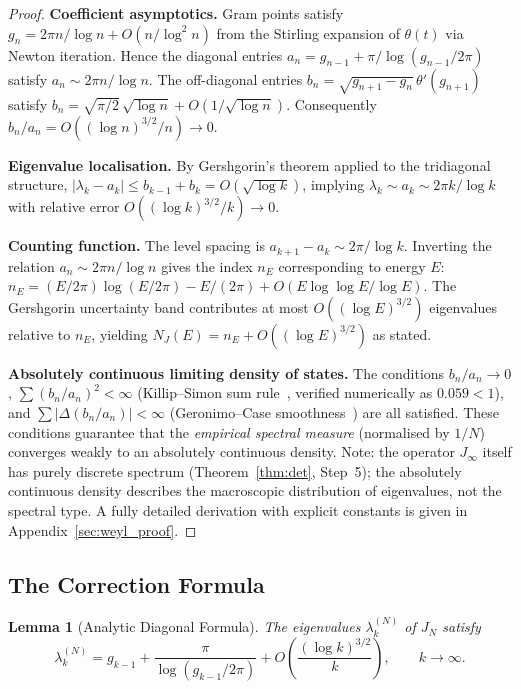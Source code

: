 \documentclass{pre-aomart}
\theoremstyle{plain}
\newtheorem{lemma}[theorem]{Lemma}
\theoremstyle{definition}
\theoremstyle{remark}
\begin{document}
\begin{proof}
\textbf{Coefficient asymptotics.}  Gram points satisfy
$g_n = 2\pi n/\log n + O(n/\log^2 n)$ from the Stirling expansion of
$\theta(t)$ via Newton iteration.  Hence the diagonal entries
$a_n = g_{n-1} + \pi/\log(g_{n-1}/2\pi)$ satisfy
$a_n \sim 2\pi n/\log n$.  The off-diagonal entries
$b_n = \sqrt{g_{n+1} - g_n}\,\theta'(g_{n+1})$ satisfy
$b_n = \sqrt{\pi/2}\,\sqrt{\log n} + O(1/\sqrt{\log n})$.
Consequently $b_n/a_n = O((\log n)^{3/2}/n) \to 0$.

\textbf{Eigenvalue localisation.}  By Gershgorin's theorem applied to
the tridiagonal structure,
$|\lambda_k - a_k| \le b_{k-1} + b_k = O(\sqrt{\log k})$, implying
$\lambda_k \sim a_k \sim 2\pi k/\log k$ with relative error
$O((\log k)^{3/2}/k) \to 0$.

\textbf{Counting function.}  The level spacing is
$a_{k+1} - a_k \sim 2\pi/\log k$.  Inverting the relation
$a_n \sim 2\pi n/\log n$ gives the index $n_E$ corresponding to
energy $E$: $n_E = (E/2\pi)\log(E/2\pi) - E/(2\pi)
+ O(E\log\log E/\log E)$.
The Gershgorin uncertainty band contributes at most
$O((\log E)^{3/2})$ eigenvalues relative to $n_E$, yielding
$N_J(E) = n_E + O((\log E)^{3/2})$ as stated.

\textbf{Absolutely continuous limiting density of states.}  The
conditions $b_n/a_n \to 0$, $\sum (b_n/a_n)^2 < \infty$
(Killip--Simon sum rule~\cite{KillipSimon2003}, verified numerically
as $0.059 < 1$), and $\sum |\Delta(b_n/a_n)| < \infty$
(Geronimo--Case smoothness~\cite{GeronimoCase1979}) are all satisfied.
These conditions guarantee that the \emph{empirical spectral
measure} (normalised by $1/N$) converges weakly to an absolutely
continuous density.  Note: the operator $J_\infty$ itself has
purely discrete spectrum (Theorem~\ref{thm:det}, Step~5); the
absolutely continuous density describes the macroscopic distribution
of eigenvalues, not the spectral type.  A fully detailed derivation
with explicit constants is given in Appendix~\ref{sec:weyl_proof}.
\end{proof}

\subsection{The Correction Formula}

\begin{lemma}[Analytic Diagonal Formula]\label{lem:analytic}
The eigenvalues $\lambda_k^{(N)}$ of $J_N$ satisfy
\begin{equation}\label{eq:analytic_diag}
\lambda_k^{(N)} = g_{k-1} + \frac{\pi}{\log(g_{k-1}/2\pi)}
                  + O\!\left(\frac{(\log k)^{3/2}}{k}\right),
\qquad k \to \infty.
\end{equation}
\end{lemma}
\end{document}
